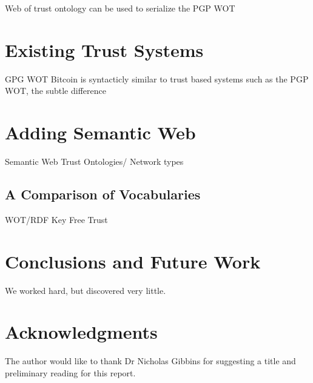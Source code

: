 \documentclass{acm_proc_article-sp}
\begin{document}
Web of trust ontology can be used to serialize the PGP WOT
\cite{_web_2004}

\section{Existing Trust Systems}
GPG WOT
Bitcoin is syntacticly similar to trust based systems such as the PGP WOT, the subtle difference 

\section{Adding Semantic Web}
Semantic Web Trust Ontologies/ Network types
\subsection{A Comparison of Vocabularies}
WOT/RDF
Key Free Trust

\section{Conclusions and Future Work}
We worked hard, but discovered very little.

\section{Acknowledgments}
The author would like to thank Dr Nicholas Gibbins for suggesting a title and preliminary reading for this report.

%


%
%
\end{document}
